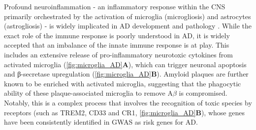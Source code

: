 \newpage
{}
Profound neuroinflammation - an inflammatory response within the CNS primarily orchestrated by the activation of microglia (microgliosis) and astrocytes (astrogliosis) - is widely implicated in AD development and pathology \cite{Cisbani2021,Griciuc2021}. While the exact role of the immune response is poorly understood in AD, it is widely accepted that an imbalance of the innate immune response is at play. This includes an extensive release of pro-inflammatory neurotoxic cytokines from activated microglia\cite{Frost2019} (\cref{fig:microglia_AD}\textbf{A}), which can trigger neuronal apoptosis\cite{Qin2002,Wang2015b} and β-secretase upregulation\cite{Chen2012} (\cref{fig:microglia_AD}\textbf{B}). Amyloid plaques are further known to be enriched with activated microglia\cite{PL1987}, suggesting that the phagocytic ability of these plaque-associated microglia to remove A$\beta$ is compromised\cite{Mawuenyega2010}. Notably, this is a complex process that involves the recognition of toxic species by receptors (such as TREM2, CD33 and CR1, \cref{fig:microglia_AD}\textbf{B}), whose genes have been consistently identified in GWAS as risk genes for AD. 

